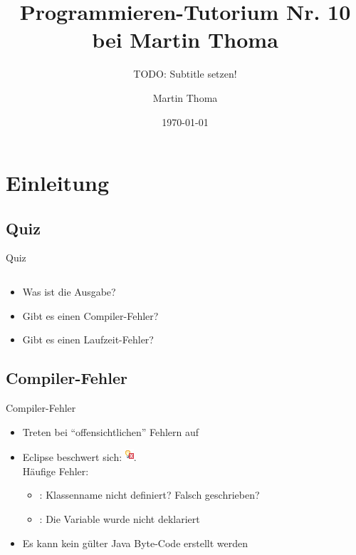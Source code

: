 \documentclass[usepdftitle=false,hyperref={pdfpagelabels=false}]{beamer}
\institute{Fakultät für Informatik}
\newcommand\tutor{Martin Thoma}
\newcommand\tutNR{10}
\newcommand\titleText{Programmieren-Tutorium Nr. \tutNR{} bei \tutor}
\newcommand\InsertToC[1][]{
  \begin{frame}{Outline}
    \tableofcontents[subsectionstyle=show/show/show, subsubsectionstyle=show/show/show, #1]
  \end{frame}
}
\begin{document}
\title{\titleText}
\subtitle{TODO: Subtitle setzen!}
\author{\tutor}
\date{\today}
\subject{Programmieren}

\frame{\titlepage}



\section{Einleitung}
\subsection{Quiz}
\begin{frame}{Quiz}
    \inputminted[linenos, numbersep=5pt, tabsize=4, frame=lines, label=Bool.java, fontsize=\tiny]{java}{Bool.java}
    \begin{itemize}
        \item Was ist die Ausgabe?
        \item Gibt es einen Compiler-Fehler?
        \item Gibt es einen Laufzeit-Fehler?
    \end{itemize}
\end{frame}

\subsection{Compiler-Fehler}
\begin{frame}{Compiler-Fehler}
    \begin{itemize}[<+->]
        \item Treten bei "`offensichtlichen"' Fehlern auf
        \item Eclipse beschwert sich: \includegraphics{eclipse-icon.png}.\\
            Häufige Fehler:
            \begin{itemize}
                \item {}: Klassenname nicht definiert? Falsch geschrieben?
                \item {}: Die Variable  wurde nicht deklariert
            \end{itemize}
        \item Es kann kein gülter Java Byte-Code erstellt werden
    \end{itemize}
\end{frame}
\end{document}

